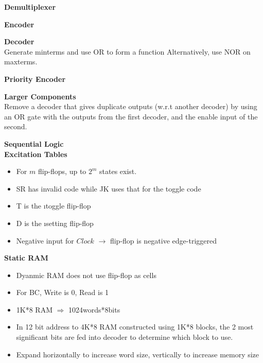 \documentclass[a4paper]{article} \usepackage[backend=biber, style=numeric, sorting=none]{biblatex}
\begin{document}
\begin{multicols*}{4}
\begin{multicols*}{2}
\textbf{{Demultiplexer}}
\vfill\null
\columnbreak
\end{multicols*}

\begin{multicols*}{2}
\textbf{{Encoder}}
\vfill\null
\columnbreak
\end{multicols*}

\begin{multicols*}{2}
\textbf{{Decoder}}
\\ Generate minterms and use OR to form a function
Alternatively, use NOR on maxterms.
\vfill\null
\columnbreak
\end{multicols*}

\begin{multicols*}{2}
\textbf{{Priority Encoder}}
\vfill\null
\columnbreak
\end{multicols*}

\begin{multicols*}{2}
\textbf{{Larger Components}}
\\ Remove a decoder that gives duplicate outputs (w.r.t another decoder) by using an OR gate with the outputs from the first decoder, and the enable input of the second.
\vfill\null
\columnbreak
\end{multicols*}

{\small\textbf{Sequential Logic }}
\\ \textbf{{Excitation Tables}}
\begin{itemize}[leftmargin=*]
\itemsep -0.5em
\item For $m$ flip-flops, up to $2^m$ states exist.
\item SR has invalid code while JK uses that for the toggle code
\item T is the {\i toggle} flip-flop
\item D is the {\i setting} flip-flop
\item Negative input for $Clock$ $\rightarrow$ flip-flop is negative edge-triggered
\end{itemize}

\textbf{{Static RAM}}
\begin{itemize}[leftmargin=*]
\itemsep -0.5em
\item Dyanmic RAM does not use flip-flop as cells
\item For BC, Write is 0, Read is 1 
\item 1K*8 RAM $\Rightarrow$ 1024words*8bits
\item In 12 bit address to 4K*8 RAM constructed using 1K*8 blocks, the 2 most significant bits are fed into decoder to determine which block to use. 
\item Expand horizontally to increase word size, vertically to increase memory size
\end{itemize}



\end{multicols*}
\end{document}
